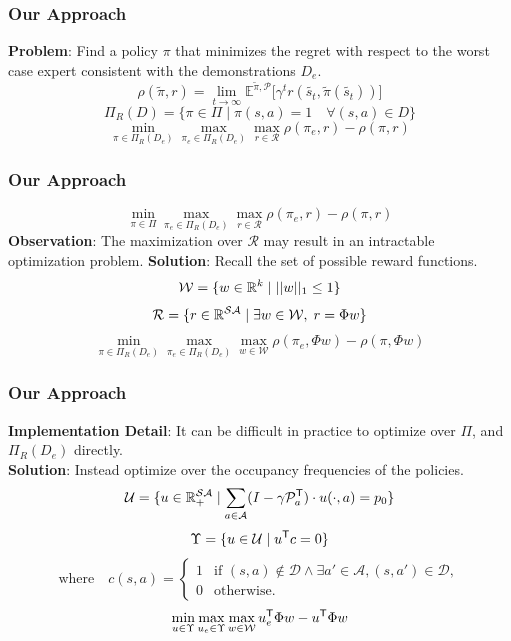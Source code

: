 \documentclass{beamer}
\begin{document}
\begin{frame}
	\frametitle{Our Approach}
	\textbf{Problem}: Find a policy $\pi$ that minimizes the regret with respect to the worst case expert consistent with the demonstrations $D_e$.
	\[ \rho(\tilde{\pi}, r) = \lim_{t \to \infty} \mathbb{E}^{\tilde{\pi}, \mathcal{P}} \lbrack \gamma^t r(\tilde{s_t}, \tilde{\pi}(\tilde{s_t})) \rbrack \]
	\[ \Pi_R(D) = \lbrace \pi \in \Pi \mid \pi(s,a) = 1 \quad \forall (s,a) \in D \rbrace \]
	\[ \min_{\pi \in \Pi_R(D_e)} \max_{\pi_e \in \Pi_R(D_e)} \max_{r \in \mathcal{R}} \rho(\pi_e, r) - \rho(\pi, r)\]
\end{frame}

\begin{frame}
	\frametitle{Our Approach}
	\[ \min_{\pi \in \Pi} \max_{\pi_e \in \Pi_R(D_e)} \max_{r \in \mathcal{R}} \rho(\pi_e, r) - \rho(\pi, r)\]
	\textbf{Observation}: The maximization over $\mathcal{R}$ may result in an intractable optimization problem.
	\textbf{Solution}: Recall the set of possible reward functions.
        \[ \mathcal{W} = \lbrace w \in \mathbb{R}^k \mid \lvert \lvert w \rvert \rvert_1 \leq 1 \rbrace \]
	\[ \mathcal{R} = \lbrace r \in \mathbb{R}^{\mathcal{S} \mathcal{A}} \mid \exists w \in \mathcal{W}, \; r = \Phi w \rbrace \]
	\[ \min_{\pi \in \Pi_R(D_e)} \max_{\pi_e \in \Pi_R(D_e)} \max_{w \in \mathcal{W}} \rho(\pi_e, \Phi w) - \rho(\pi, \Phi w)\]
\end{frame}

\begin{frame}
	\frametitle{Our Approach}
	\textbf{Implementation Detail}: It can be difficult in practice to optimize over $\Pi$, and $\Pi_R(D_e)$ directly.\\
	\textbf{Solution}: Instead optimize over the occupancy frequencies of the policies.
	\[ \mathcal{U} = \lbrace u \in \mathbb{R}_{+}^{\mathcal{SA}} \mid \sum_{a \in \mathcal{A}} (I - \gamma \mathcal{P}_a^{\mathsf{T}}) \cdot u(\cdot, a) = p_0 \rbrace \]
	\[ \Upsilon = \lbrace u \in \mathcal{U} \mid u^{\mathsf{T}} c = 0 \rbrace \]
	\[ \text{where} \quad c(s,a) =
	\begin{cases}
	1 &\text{if  }
		(s,a) \notin \mathcal{D} \wedge
		\exists a'\in \mathcal{A}, (s, a') \in \mathcal{D}, \\
	0 & \text{otherwise}.
	\end{cases} \]
	\[ \min_{u \in \Upsilon} \max_{u_e \in \Upsilon} \max_{w \in \mathcal{W}} u_e^{\mathsf{T}} \Phi w - u^{\mathsf{T}} \Phi w\]
\end{frame}
\end{document}
